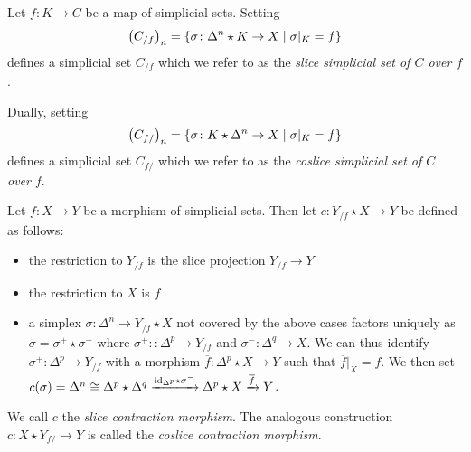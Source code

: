 \begin{definition}[(Co)Slice] %
    Let $f\colon K\to C$ be a map of simplicial sets.
    Setting 
    \begin{equation*}
        \left(C_{/f}\right)_n=\left\lbrace\sigma\colon \Delta^n\star K\to X \mid \sigma|_K=f\right\rbrace
    \end{equation*}
    defines a simplicial set $C_{/f}$ which we refer to as the \emph{slice simplicial set of $C$ over $f$}.

    Dually, setting 
    \begin{equation*}
        \left(C_{f/}\right)_n=\left\lbrace\sigma\colon K\star \Delta^n \to X \mid \sigma|_K=f\right\rbrace
    \end{equation*}
    defines a simplicial set $C_{f/}$ which we refer to as the \emph{coslice simplicial set of $C$ over $f$}.
\end{definition}
\begin{construction}%
    Let $f\colon X\to Y$ be a morphism of simplicial sets.
    Then let $c\colon Y_{/f}\star X\to Y$ be defined as follows:
    \begin{itemize}
        \item the restriction to $Y_{/f}$ is the slice projection $Y_{/f}\to Y$
        \item the restriction to $X$ is $f$
        \item a simplex $\sigma\colon\Delta^n\to Y_{/f}\star X$ not covered by the above cases factors uniquely as $\sigma=\sigma^+\star\sigma^-$ where $\sigma^+\colon\colon\Delta^p\to Y_{/f}$ and $\sigma^-\colon\Delta^q\to X$.
              We can thus identify $\sigma^+\colon\Delta^p\to Y_{/f}$ with a morphism $\overline{f}\colon\Delta^p\star X\to Y$ such that $\overline{f}|_{X}=f$.
              We then set $c(\sigma)=\Delta^n\cong\Delta^p\star\Delta^q\xrightarrow{\text{id}_{\Delta^p}\star\sigma^-}\Delta^p\star X\xrightarrow{\overline{f}} Y$.
    \end{itemize}
    We call $c$ the \emph{slice contraction morphism}.
    The analogous construction $c\colon X\star Y_{f/}\to Y$ is called the \emph{coslice contraction morphism}.
\end{construction}

